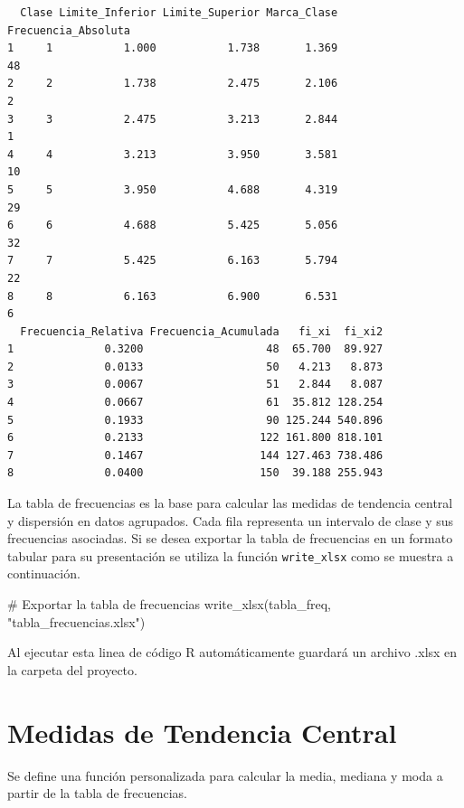 \documentclass[
  spanish,
  letterpaper,
]{book}
\newenvironment{Shaded}{\begin{snugshade}}{\end{snugshade}}
\newcommand{\CommentTok}[1]{\textcolor[rgb]{0.37,0.37,0.37}{#1}}
\newcommand{\FunctionTok}[1]{\textcolor[rgb]{0.28,0.35,0.67}{#1}}
\newcommand{\NormalTok}[1]{\textcolor[rgb]{0.00,0.23,0.31}{#1}}
\newcommand{\StringTok}[1]{\textcolor[rgb]{0.13,0.47,0.30}{#1}}
\begin{document}
\begin{verbatim}
  Clase Limite_Inferior Limite_Superior Marca_Clase Frecuencia_Absoluta
1     1           1.000           1.738       1.369                  48
2     2           1.738           2.475       2.106                   2
3     3           2.475           3.213       2.844                   1
4     4           3.213           3.950       3.581                  10
5     5           3.950           4.688       4.319                  29
6     6           4.688           5.425       5.056                  32
7     7           5.425           6.163       5.794                  22
8     8           6.163           6.900       6.531                   6
  Frecuencia_Relativa Frecuencia_Acumulada   fi_xi  fi_xi2
1              0.3200                   48  65.700  89.927
2              0.0133                   50   4.213   8.873
3              0.0067                   51   2.844   8.087
4              0.0667                   61  35.812 128.254
5              0.1933                   90 125.244 540.896
6              0.2133                  122 161.800 818.101
7              0.1467                  144 127.463 738.486
8              0.0400                  150  39.188 255.943
\end{verbatim}

La tabla de frecuencias es la base para calcular las medidas de
tendencia central y dispersión en datos agrupados. Cada fila representa
un intervalo de clase y sus frecuencias asociadas. Si se desea exportar
la tabla de frecuencias en un formato tabular para su presentación se
utiliza la función \texttt{write\_xlsx} como se muestra a continuación.

\begin{Shaded}
\begin{Highlighting}[]
\CommentTok{\# Exportar la tabla de frecuencias}
\FunctionTok{write\_xlsx}\NormalTok{(tabla\_freq, }\StringTok{"tabla\_frecuencias.xlsx"}\NormalTok{)}
\end{Highlighting}
\end{Shaded}

Al ejecutar esta linea de código R automáticamente guardará un archivo
.xlsx en la carpeta del proyecto.

\section{Medidas de Tendencia
Central}\label{medidas-de-tendencia-central-3}

Se define una función personalizada para calcular la media, mediana y
moda a partir de la tabla de frecuencias.
\end{document}
